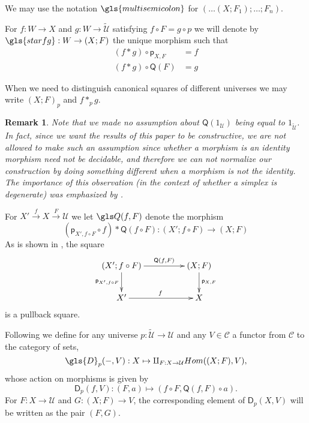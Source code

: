 \documentclass[12pt]{article}
\numberwithin{equation}{section}
\newenvironment{eq}{\begin{equation}}{\end{equation}}
\newtheorem{remark}[proposition]{Remark}
\newcommand{\llabel}[1]{\label{#1}}
\newcommand{\sr}{\rightarrow}
\newcommand{\wt}{\widetilde}
\newcommand{\C}{{\mathcal C}}  %
\newcommand{\id}{1}            %
\newcommand{\p}{\mathsf{p}}
\newcommand{\U}{\mathcal{U}}
\newcommand{\D}{\mathsf{D}}
\newcommand{\Q}{\mathsf{Q}}
\begin{document}
We may use the notation $\gls{multisemicolon}$ for $(\dots(X;F_1);\dots;F_n)$.

For $f:W\sr X$ and $g:W\sr \wt{\U}$ satisfying $f\circ F = g \circ p$ we will denote by $\gls{starfg} : W \sr (X;F)$ the unique morphism
such that
%
\begin{align}
  (f*g)\circ \p_{X,F} & =f \label{star-eq1} \\
  (f*g)\circ \Q(F) & =g \label{star-eq2}
\end{align}

%
When we need to distinguish canonical squares of different universes we may
write $(X;F)_{p}$ and $f*_p g$.
%
\begin{remark}\rm
\llabel{2015.03.29.rm1} Note that we made no assumption about $\Q(\id_\U)$ being
equal to $\id_{\wt{\U}}$. In fact, since we want the results of this paper to be
constructive, we are not allowed to make such an assumption since 
whether a morphism is an identity morphism need not be
decidable, and therefore we can not normalize our construction by doing
something different when a morphism is not the identity.  The importance
of this observation (in the context of whether a simplex is degenerate)
was emphasized by \cite{BCH}.
\end{remark}
%
For $X'\stackrel{f}{\sr}X\stackrel{F}{\sr}\U$ we let $\gls Q(f,F)$ denote the
morphism
%
$$(\p_{X',f\circ F}\circ f)*\Q(f\circ F):(X';f\circ F)\sr (X;F)$$
%
As is shown in \cite{fromunivwithPi}, the square
%
\begin{eq}
\llabel{2015.04.06.l0.sq}
\begin{xy}
          \xymatrix@C=4pc{ (X';f\circ F) \ar[r]^-{\Q(f,F)} \ar[d]_{\p_{X',f\circ
                F}} & (X;F) \ar[d]^{\p_{X,F}}\\ X' \ar[r]^{f} & X }
       \end{xy}
\end{eq}%
%
is a pullback square.

Following \cite{fromunivwithPi} we define for any universe $p:\wt{\U}\sr \U$ and
any $V\in {\C}$ a functor from $\C$ to the category of sets,
%
$$\gls{D}_p(-,V):X\mapsto \amalg_{F:X\sr \U}Hom((X;F), V),$$
%
whose action on morphisms is given by
%
$$\D_p(f,V):(F,a)\mapsto (f\circ F, \Q(f,F)\circ a).$$
For $F:X\sr \U$ and $G : (X;F) \sr V$, the corresponding element of
$\D_p(X,V)$ will be written as the pair $(F,G)$.
\end{document}
